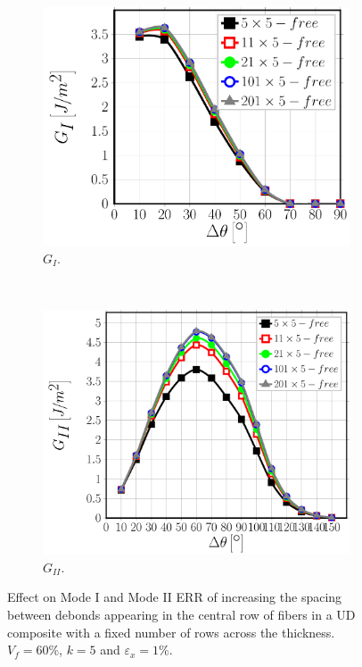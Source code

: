 \documentclass[review]{elsarticle}
\begin{document}
\begin{figure}[!h]
\centering  
    \begin{subfigure}[b]{0.475\textwidth}
        \includegraphics[width=\textwidth]{sideabovefibers-t5-vf60-GI.pdf}
        \caption{$G_{I}$.}\label{subfig:sideabovefiber60MIt5}
    \end{subfigure} ~
    \begin{subfigure}[b]{0.475\textwidth}
        \includegraphics[width=\textwidth]{sideabovefibers-t5-vf60-GII.pdf}
        \caption{$G_{II}$.}\label{subfig:sideabovefiber60MIIt5}
    \end{subfigure}
    
\caption{Effect on Mode I and Mode II ERR of increasing the spacing between debonds appearing in the central row of fibers in a UD composite with a fixed number of rows across the thickness.  $V_{f}=60\%$, $k=5$ and $\varepsilon_{x}=1\%$.}\label{fig:sideabovefibersthickfixed}
\end{figure}
\end{document}
